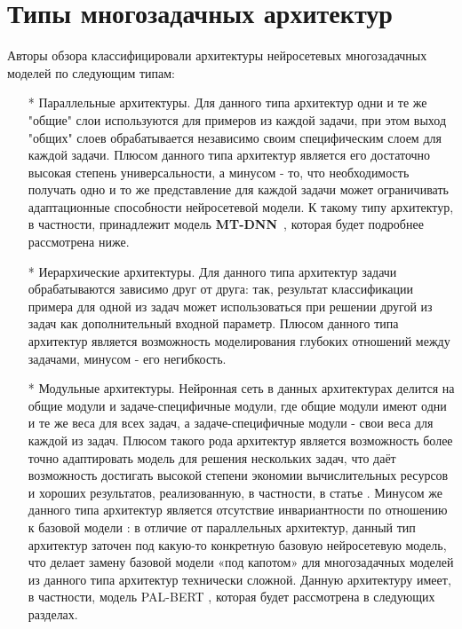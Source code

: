 \section{Типы многозадачных архитектур}
Авторы обзора \cite{chen_2021} классифицировали архитектуры нейросетевых многозадачных моделей по следующим типам:
\begin{itemize}
\item[*] Параллельные архитектуры. Для данного типа архитектур одни и те же "общие" слои используются для примеров из каждой задачи, при этом выход "общих" слоев обрабатывается независимо своим специфическим слоем для каждой задачи. Плюсом данного типа архитектур является его достаточно высокая степень универсальности, а минусом - то, что необходимость получать одно и то же представление для каждой задачи может ограничивать адаптационные способности нейросетевой модели. К такому типу архитектур, в частности, принадлежит модель \textbf{MT-DNN}~\cite{mtdnn}, которая будет подробнее рассмотрена ниже. 
\item[*] Иерархические архитектуры. Для данного типа архитектур задачи обрабатываются зависимо друг от друга: так, результат классификации примера для одной из задач может использоваться при решении другой из задач как дополнительный входной параметр. Плюсом данного типа архитектур является возможность моделирования глубоких отношений между задачами, минусом - его негибкость. 
\item[*] Модульные архитектуры. Нейронная сеть в данных архитектурах делится на общие модули и задаче-специфичные модули, где общие модули имеют одни и те же веса для всех задач, а задаче-специфичные модули - свои веса для каждой из задач. Плюсом такого рода архитектур является возможность более точно адаптировать модель для решения нескольких задач, что даёт возможность достигать высокой степени экономии вычислительных ресурсов и хороших результатов, реализованную, в частности, в статье \cite{maziarka_2021}. Минусом же данного типа архитектур является отсутствие инвариантности по отношению к базовой модели : в отличие от параллельных архитектур, данный тип архитектур заточен под какую-то конкретную базовую нейросетевую модель, что делает замену базовой модели «под капотом» для многозадачных моделей из данного типа архитектур технически сложной. Данную архитектуру имеет, в частности, модель PAL-BERT  \cite{stickland_2019}, которая будет рассмотрена в следующих разделах. 

\end{itemize}
